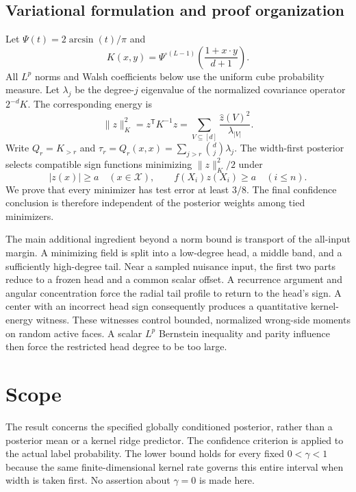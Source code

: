 \documentclass[11pt]{article}
\theoremstyle{remark}\newtheorem{remark}[theorem]{Remark}
\begin{document}
\subsection{Variational formulation and proof organization}
Let $\Psi(t)=2\arcsin(t)/\pi$ and
\[
 K(x,y)=\Psi^{\circ(L-1)}\!\left(\frac{1+x\cdot y}{d+1}\right).
\]
All $L^p$ norms and Walsh coefficients below use the uniform cube
probability measure. Let $\lambda_j$ be the degree-$j$ eigenvalue of
the normalized covariance operator $2^{-d}K$. The corresponding energy
is
\[
 \|z\|_K^2=z^{\mathsf T}K^{-1}z
      =\sum_{V\subseteq[d]}\frac{\widehat z(V)^2}{\lambda_{|V|}}.
\]
Write $Q_r=K_{>r}$ and
$\tau_r=Q_r(x,x)=\sum_{j>r}\binom dj\lambda_j$.
The width-first posterior selects compatible sign functions minimizing
$\|z\|_K^2/2$ under
\begin{equation}\label{eq:obstacle}
 |z(x)|\ge a\quad(x\in\mathcal X),\qquad
 f(X_i)z(X_i)\ge a\quad(i\le n).
\end{equation}
We prove that every minimizer has test error at least $3/8$. The final
confidence conclusion is therefore independent of the posterior weights
among tied minimizers.

The main additional ingredient beyond a norm bound is transport of the
all-input margin. A minimizing field is split into a low-degree head,
a middle band, and a sufficiently high-degree tail. Near a sampled
nuisance input, the first two parts reduce to a frozen head and a common
scalar offset. A recurrence argument and angular concentration force
the radial tail profile to return to the head's sign. A center with an
incorrect head sign consequently produces a quantitative kernel-energy
witness. These witnesses control bounded, normalized wrong-side moments
on random active faces. A scalar $L^p$ Bernstein inequality and parity
influence then force the restricted head degree to be too large.


















\section{Scope}
The result concerns the specified globally conditioned posterior, rather
than a posterior mean or a kernel ridge predictor. The confidence
criterion is applied to the actual label probability. The lower bound
holds for every fixed $0<\gamma<1$ because the same finite-dimensional
kernel rate governs this entire interval when width is taken first.
No assertion about $\gamma=0$ is made here.
\end{document}
